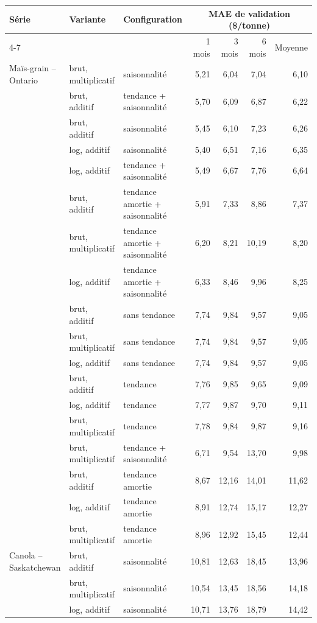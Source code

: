\begin{tabular}{lllrrrr}
\toprule
Série & Variante & Configuration & \multicolumn{4}{c}{MAE de validation (\$/tonne)} \\
\cmidrule(lr){4-7}
& & & 1 mois & 3 mois & 6 mois & Moyenne \\
\midrule
Maïs-grain -- Ontario & brut, multiplicatif & saisonnalité & 5,21 & 6,04 & 7,04 & 6,10 \\
 & brut, additif & tendance + saisonnalité & 5,70 & 6,09 & 6,87 & 6,22 \\
 & brut, additif & saisonnalité & 5,45 & 6,10 & 7,23 & 6,26 \\
 & log, additif & saisonnalité & 5,40 & 6,51 & 7,16 & 6,35 \\
 & log, additif & tendance + saisonnalité & 5,49 & 6,67 & 7,76 & 6,64 \\
 & brut, additif & tendance amortie + saisonnalité & 5,91 & 7,33 & 8,86 & 7,37 \\
 & brut, multiplicatif & tendance amortie + saisonnalité & 6,20 & 8,21 & 10,19 & 8,20 \\
 & log, additif & tendance amortie + saisonnalité & 6,33 & 8,46 & 9,96 & 8,25 \\
 & brut, additif & sans tendance & 7,74 & 9,84 & 9,57 & 9,05 \\
 & brut, multiplicatif & sans tendance & 7,74 & 9,84 & 9,57 & 9,05 \\
 & log, additif & sans tendance & 7,74 & 9,84 & 9,57 & 9,05 \\
 & brut, additif & tendance & 7,76 & 9,85 & 9,65 & 9,09 \\
 & log, additif & tendance & 7,77 & 9,87 & 9,70 & 9,11 \\
 & brut, multiplicatif & tendance & 7,78 & 9,84 & 9,87 & 9,16 \\
 & brut, multiplicatif & tendance + saisonnalité & 6,71 & 9,54 & 13,70 & 9,98 \\
 & brut, additif & tendance amortie & 8,67 & 12,16 & 14,01 & 11,62 \\
 & log, additif & tendance amortie & 8,91 & 12,74 & 15,17 & 12,27 \\
 & brut, multiplicatif & tendance amortie & 8,96 & 12,92 & 15,45 & 12,44 \\
\midrule
Canola -- Saskatchewan & brut, additif & saisonnalité & 10,81 & 12,63 & 18,45 & 13,96 \\
 & brut, multiplicatif & saisonnalité & 10,54 & 13,45 & 18,56 & 14,18 \\
 & log, additif & saisonnalité & 10,71 & 13,76 & 18,79 & 14,42 \\

\end{tabular}
